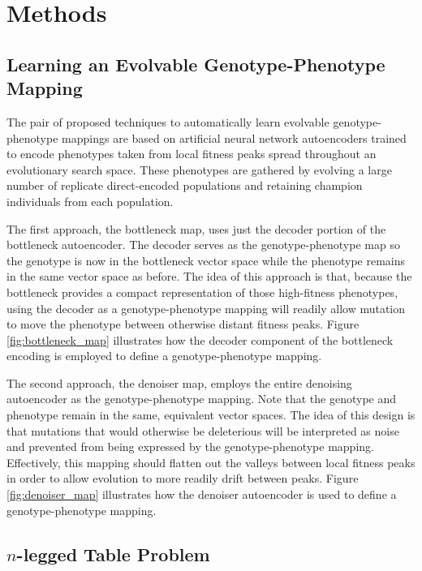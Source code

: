 \section{Methods} \label{sec:methods}

\subsection{Learning an Evolvable Genotype-Phenotype Mapping}

The pair of proposed techniques to automatically learn evolvable genotype-phenotype mappings are based on artificial neural network autoencoders trained to encode phenotypes taken from local fitness peaks spread throughout an evolutionary search space.
These phenotypes are gathered by evolving a large number of replicate direct-encoded populations and retaining champion individuals from each population.



The first approach, the bottleneck map, uses just the decoder portion of the bottleneck autoencoder.
The decoder serves as the genotype-phenotype map so the genotype is now in the bottleneck vector space while the phenotype remains in the same vector space as before.
The idea of this approach is that, because the bottleneck provides a compact representation of those high-fitness phenotypes, using the decoder as a genotype-phenotype mapping will readily allow mutation to move the phenotype between otherwise distant fitness peaks.
Figure \ref{fig:bottleneck_map} illustrates how the decoder component of the bottleneck encoding is employed to define a genotype-phenotype mapping.

The second approach, the denoiser map, employs the entire denoising autoencoder as the genotype-phenotype mapping.
Note that the genotype and phenotype remain in the same, equivalent vector spaces.
The idea of this design is that mutations that would otherwise be deleterious will be interpreted as noise and prevented from being expressed by the genotype-phenotype mapping.
Effectively, this mapping should flatten out the valleys between local fitness peaks in order to allow evolution to more readily drift between peaks.
Figure \ref{fig:denoiser_map} illustrates how the denoiser autoencoder is used to define a genotype-phenotype mapping.

\subsection{$n$-legged Table Problem}


